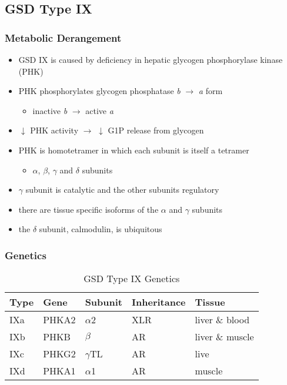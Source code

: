 \documentclass{scrartcl}
\begin{document}
\subsection{GSD Type IX}
\label{sec:org1154d49}
\subsubsection{Metabolic Derangement}
\label{sec:org8407742}
\begin{itemize}
\item GSD IX is caused by deficiency in hepatic glycogen phosphorylase kinase (PHK)
\item PHK phosphorylates glycogen phosphatase \emph{b} \(\to\) \emph{a} form
\begin{itemize}
\item inactive \emph{b} \(\to\)  active \emph{a}
\end{itemize}
\item \(\downarrow\) PHK activity \(\to\) \(\downarrow\) G1P release from glycogen
\item PHK is homotetramer in which each subunit is itself a tetramer
\begin{itemize}
\item \(\alpha\), \(\beta\), \(\gamma\) and \(\delta\) subunits
\end{itemize}
\item \(\gamma\) subunit is catalytic and the other subunits regulatory
\item there are tissue specific isoforms of the \(\alpha\) and \(\gamma\) subunits
\item the \(\delta\) subunit, calmodulin, is ubiquitous
\end{itemize}

\subsubsection{Genetics}
\label{sec:org2cd31d9}
\begin{table}[htbp]
\caption{\label{tab:org42d4827}
GSD Type IX Genetics}
\centering
\begin{tabular}{lllll}
Type & Gene & Subunit & Inheritance & Tissue\\
\hline
IXa & PHKA2 & \(\alpha\)2 & XLR & liver \& blood\\
IXb & PHKB & \(\beta\) & AR & liver \& muscle\\
IXc & PHKG2 & \(\gamma\)TL & AR & live\\
IXd & PHKA1 & \(\alpha\)1 & AR & muscle\\
\end{tabular}
\end{table}
\end{document}
